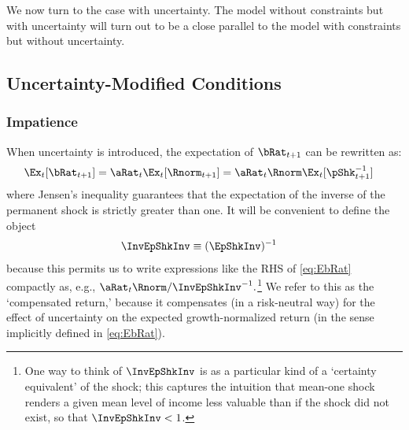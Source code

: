 \documentclass[BufferStockTheory]{subfiles}
\begin{document}
We now turn to the case with uncertainty.  The model without constraints but with uncertainty will turn out to be a close parallel to the model with constraints but without uncertainty.

\hypertarget{Uncertainty-Modified-Conditions}{}
\subsection{Uncertainty-Modified Conditions}
\subsubsection{Impatience}





When uncertainty is introduced, the expectation of $\bRat_{t+1}$ can be rewritten as:  
\begin{align}
  \Ex_{t}[\bRat_{t+1}]  & =  \aRat_{t}\Ex_{t}[\Rnorm_{t+1}] = \aRat_{t}\Rnorm\Ex_{t}[\pShk_{t+1}^{-1}] \label{eq:EbRat}
\end{align}
where Jensen's inequality guarantees that the expectation of the inverse of the permanent
shock is strictly greater than one.  It will be convenient to define the object \hypertarget{InvEpShkInv}{}
\begin{align*}
  \InvEpShkInv  & \equiv  (\EpShkInv)^{-1}
\end{align*}
because this permits us to write expressions like the RHS of
\eqref{eq:EbRat} compactly as, e.g., $\aRat_{t}\Rnorm/
\InvEpShkInv^{-1}.$\footnote{One way to think of $\InvEpShkInv$ is as
  a particular kind of a `certainty equivalent' of the shock; this
  captures the intuition that mean-one shock renders a given mean
  level of income less valuable than if the shock did not exist, so
  that $\InvEpShkInv < 1$.}  We refer to this as the `compensated return,' because it compensates (in a risk-neutral way) for the effect of
uncertainty on the expected growth-normalized return (in the sense implicitly defined in
\eqref{eq:EbRat}).
\end{document}
